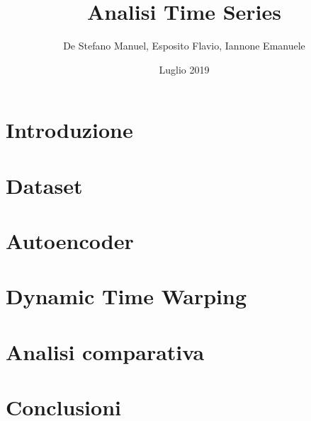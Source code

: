 \documentclass[12pt]{report}
\title{Analisi Time Series}
\author{De Stefano Manuel, Esposito Flavio, Iannone Emanuele}
\date{Luglio 2019}
\begin{document}
\maketitle
\tableofcontents

\chapter{Introduzione}


\chapter{Dataset}


\chapter{Autoencoder}


\chapter{Dynamic Time Warping}


\chapter{Analisi comparativa}


\chapter{Conclusioni}


\printbibliography
\end{document}
